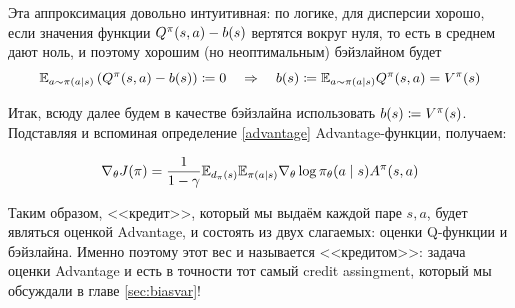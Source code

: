 Эта аппроксимация довольно интуитивная: по логике, для дисперсии хорошо, если значения функции $Q^\pi(s, a) \HM- b(s)$ вертятся вокруг нуля, то есть в среднем дают ноль, и поэтому хорошим (но неоптимальным) бэйзлайном будет
$$\mathbb{E}_{a \sim \pi(a \mid s)} \left( Q^{\pi}(s, a) - b(s) \right) \coloneqq 0 \quad \Rightarrow \quad b(s) \coloneqq \mathbb{E}_{a \sim \pi(a \mid s)} Q^{\pi}(s, a) = V^\pi(s)$$

Итак, всюду далее будем в качестве бэйзлайна использовать $b(s) \HM \coloneqq V^\pi(s)$. Подставляя и вспоминая определение \eqref{advantage} Advantage-функции, получаем:
\begin{proposition}
\begin{equation}\label{advantagepg}
\nabla_{\theta} J(\pi) = \frac{1}{1 - \gamma}\mathbb{E}_{d_\pi(s)} \mathbb{E}_{\pi(a \mid s)} \nabla_{\theta} \log \pi_\theta (a \mid s) A^{\pi}(s, a)
\end{equation}
\end{proposition}

Таким образом, <<кредит>>, который мы выдаём каждой паре $s, a$, будет являться оценкой Advantage, и состоять из двух слагаемых: оценки Q-функции и бэйзлайна. Именно поэтому этот вес и называется <<кредитом>>: задача оценки Advantage и есть в точности тот самый credit assingment, который мы обсуждали в главе \ref{sec:biasvar}!




